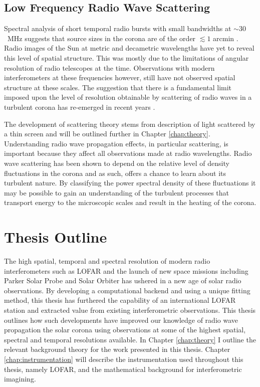 \subsection{Low Frequency Radio Wave Scattering}

Spectral analysis of short temporal radio bursts with small bandwidths at $\sim 30$~MHz suggests that source sizes in the corona are of the order $\lesssim 1$ arcmin \citep{McConnell1980, Kontar2017}. Radio images of the Sun at metric and decametric wavelengths have yet to reveal this level of spatial structure. This was mostly due to the limitations of angular resolution of radio telescopes at the time. 
Observations with modern interferometers at these frequencies however, still have not observed spatial structure at these scales. The suggestion that there is a fundamental limit imposed upon the level of resolution obtainable by scattering of radio waves in a turbulent corona \citep{Bastian1994} has re-emerged in recent years \citep{Thejappa2007,Thejappa2008,Kontar2017,Kontar2019}. 

The development of scattering theory stems from \cite{Chandrasekhar1952} description of light scattered by a thin screen and will be outlined further in Chapter \ref{chap:theory}. Understanding radio wave propagation effects, in particular scattering, is important because they affect all observations made at radio wavelengths. Radio wave scattering has been shown to depend on the relative level of density fluctuations in the corona and as such, offers a chance to learn about its turbulent nature. By classifying the power spectral density of these fluctuations it may be possible to gain an understanding of the turbulent processes that transport energy to the microscopic scales and result in the heating of the corona. 


\section{Thesis Outline}
The high spatial, temporal and spectral resolution of modern radio interferometers such as LOFAR and the launch of new space missions including Parker Solar Probe \citep[PSP;][]{Fox2016} and Solar Orbiter \citep{Muller2020} has ushered in a new age of solar radio observations. By developing a computational backend and using a unique fitting method, this thesis has furthered the capability of an international LOFAR station and extracted value from existing interferometric observations. This thesis outlines how such developments have improved our knowledge of radio wave propagation the solar corona using observations at some of the highest spatial, spectral and temporal resolutions available. In Chapter \ref{chap:theory} I outline the relevant background theory for the work presented in this thesis. Chapter \ref{chap:instrumentation} will describe the instrumentation used throughout this thesis, namely LOFAR, and the mathematical background for interferometric imagining. 

